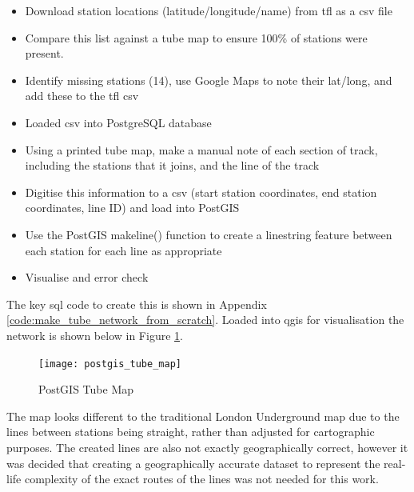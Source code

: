 \begin{itemize}
\item Download station locations (latitude/longitude/name) from \gls{tfl} as a \gls{csv} file
\item Compare this list against a tube map to ensure 100\% of stations were present.
\item Identify missing stations (14), use Google Maps to note their lat/long, and add these to the \gls{tfl} \gls{csv}
\item Loaded \gls{csv} into PostgreSQL database
\item Using a printed tube map, make a manual note of each section of track, including the stations that it joins, and the line of the track
\item Digitise this information to a \gls{csv} (start station coordinates, end station coordinates, line ID) and load into PostGIS
\item Use the PostGIS makeline() function to create a linestring feature between each station for each line as appropriate
\item Visualise and error check
\end{itemize}

The key \gls{sql} code to create this is shown in Appendix \autoref{code:make_tube_network_from_scratch}. Loaded into \gls{qgis} for visualisation the network is shown below in Figure \ref{fig:postgis_tube_map}.

\begin{figure}[H]
\centering
\texttt{[image: postgis\_tube\_map]}
\caption{PostGIS Tube Map}
\label{fig:postgis_tube_map}
\end{figure}

The map looks different to the traditional London Underground map due to the lines between stations being straight, rather than adjusted for cartographic purposes. The created lines are also not exactly geographically correct, however it was decided that creating a geographically accurate dataset to represent the real-life complexity of the exact routes of the lines was not needed for this work.

